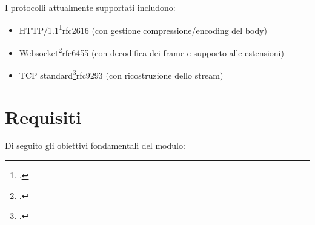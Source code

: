 I protocolli attualmente supportati includono:
\begin{itemize}
    \setlength{\itemsep}{4pt}
    \setlength{\parskip}{4pt}
    \item HTTP/1.1\footcite{RFC2616, Hypertext Transfer Protocol -- HTTP/1.1}{rfc2616} (con gestione compressione/encoding del body)
    \item Websocket\footcite{RFC6455, The WebSocket Protocol}{rfc6455} (con decodifica dei frame e supporto alle estensioni)
    \item TCP standard\footcite{RFC9293, Transmission Control Protocol (TCP)}{rfc9293} (con ricostruzione dello stream)
\end{itemize}

\section{Requisiti}

Di seguito gli obiettivi fondamentali del modulo:

